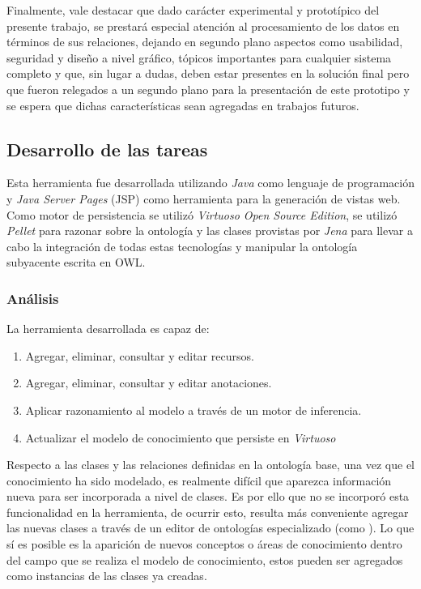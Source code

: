 \begin{itemize}
Finalmente, vale destacar que dado carácter experimental y prototípico del presente trabajo, se prestará especial atención al procesamiento de los datos en términos de sus relaciones, dejando en segundo plano aspectos como usabilidad, seguridad y diseño a nivel gráfico, tópicos importantes para cualquier sistema completo y que, sin lugar a dudas, deben estar presentes en la solución final pero que fueron relegados a un segundo plano para la presentación de este prototipo y se espera que dichas características sean agregadas en trabajos futuros.

\subsection{Desarrollo de las tareas}
Esta herramienta fue desarrollada utilizando \textit{Java} como lenguaje de programación y \textit{Java Server Pages} (JSP) como herramienta para la generación de vistas web. Como motor de persistencia se utilizó \textit{Virtuoso Open Source Edition}, se utilizó \textit{Pellet} para razonar sobre la ontología y las clases provistas por \textit{Jena} para llevar a cabo la integración de todas estas tecnologías y manipular la ontología subyacente escrita en OWL.

\subsubsection{Análisis}
La herramienta desarrollada es capaz de:

\begin{enumerate}
    \item Agregar, eliminar, consultar y editar recursos.
    \item Agregar, eliminar, consultar y editar anotaciones.
    \item Aplicar razonamiento al modelo a través de un motor de inferencia.
    \item Actualizar el modelo de conocimiento que persiste en \textit{Virtuoso}
\end{enumerate}

Respecto a las clases y las relaciones definidas en la ontología base, una vez que el conocimiento ha sido modelado, es realmente difícil que aparezca información nueva para ser incorporada a nivel de clases. Es por ello que no se incorporó esta funcionalidad en la herramienta, de ocurrir esto, resulta más conveniente agregar las nuevas clases a través de un editor de ontologías especializado (como ). Lo que sí es posible es la aparición de nuevos conceptos o áreas de conocimiento dentro del campo que se realiza el modelo de conocimiento, estos pueden ser agregados como instancias de las clases ya creadas.


\end{itemize}

